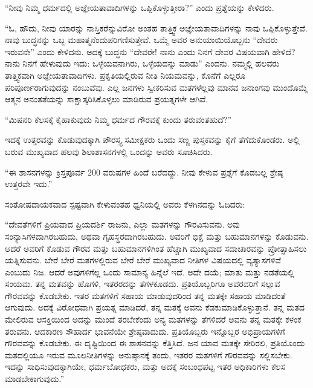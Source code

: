 \vskip 5pt

“ನೀವು ನಿಮ್ಮ ಧರ್ಮದಲ್ಲಿ ಅಜ್ಞೇಯತಾವಾದಿಗಳನ್ನು ಒಪ್ಪಿಕೊಳ್ಳುತ್ತೀರಾ?” ಎಂದು ಪ್ರಶ್ನೆಯನ್ನು ಕೇಳಿದರು.

\vskip 5pt

“ಓ, ಹೌದು, ನೀವು ಯಾರನ್ನು ನಾಸ್ತಿಕರೆನ್ನುವಿರೋ ಅಂತಹ ತಾತ್ತ್ವಿಕ ಅಜ್ಞೇಯತಾವಾದಿಗಳನ್ನು ನಾವು ಒಪ್ಪಿಕೊಳ್ಳುತ್ತೇವೆ. ನಾವು ಬುದ್ಧನನ್ನು ಒಬ್ಬ ಮಹಾತ್ಮನೆಂದು\break ಪರಿಗಣಿಸುತ್ತೇವೆ. ಒಮ್ಮೆ ಅವರ ಅನುಯಾಯಿಯೊಬ್ಬನು “ದೇವರು ಇರುವನೇ” ಎಂದು ಕೇಳಿದನು. ಅದಕ್ಕೆ ಬುದ್ಧನು “ದೇವರೇ! ನಾನು ಎಂದು ನಿನಗೆ ದೇವರ ವಿಷಯವಾಗಿ ಹೇಳಿದೆ? ನಾನು ನಿನಗೆ ಹೇಳುವುದು ಇದು: ಒಳ್ಳೆಯವನಾಗಿರು, ಒಳ್ಳೆಯದನ್ನು ಮಾಡು” ಎಂದನು. ನಮ್ಮಲ್ಲಿ ಹಲವರು ತಾತ್ತ್ವಿಕವಾಗಿ ಅಜ್ಞೇಯತಾವಾದಿಗಳು. ಪ್ರಕೃತಿಯಲ್ಲಿರುವ ನೀತಿ ನಿಯಮವನ್ನು, ಕೊನೆಗೆ ಎಲ್ಲರೂ ಪರಿಪೂರ್ಣರಾಗುವುದನ್ನು ನಂಬುವೆವು. ಎಲ್ಲ ಜನಗಳು ಸ್ವೀಕರಿಸುವ ಮತಗಳೆಲ್ಲವು ಮಾನವ ಜನಾಂಗವು ಮುಂದೊಮ್ಮೆ ಆತ್ಮನ ಅನಂತತೆಯನ್ನು ಸಾಕ್ಷಾತ್ಕರಿಸಿಕೊಳ್ಳಲು ಮಾಡಿರುವ ಪ್ರಯತ್ನಗಳೇ ಆಗಿವೆ.

\vskip 5pt

“ಮಿಷನರಿ ಕೆಲಸಕ್ಕೆ ಕೈಹಾಕುವುದು ನಿಮ್ಮ ಧರ್ಮದ ಗೌರವಕ್ಕೆ ಕುಂದು ತರುವಂತಹುದೆ?”

\vskip 5pt

ಇದಕ್ಕೆ ಉತ್ತರವನ್ನು ಕೊಡುವುದಕ್ಕಾಗಿ ಪೌರಸ್ತ್ಯ ಸಮೀಕ್ಷಕರು ಒಂದು ಸಣ್ಣ ಪುಸ್ತಕವನ್ನು ಕೈಗೆ ತೆಗೆದುಕೊಂಡರು. ಅಲ್ಲಿ ಬರುವ ಮುಖ್ಯವಾದ ಹಲವು ಶಿಲಾಶಾಸನಗಳಲ್ಲಿ ಒಂದನ್ನು ಅವರು ಸೂಚಿಸಿದರು.

\vskip 5pt

“ಈ ಶಾಸನಗಳನ್ನು ಕ್ರಿಸ್ತಪೂರ್ವ 200 ವರುಷಗಳ ಹಿಂದೆ ಬರೆದದ್ದು. ನೀವು ಕೇಳುವ ಪ್ರಶ್ನೆಗೆ ಕೊಡಬಲ್ಲ ಶ್ರೇಷ್ಠ ಉತ್ತರವೇ ಇದು.”

\vskip 5pt

ಸಂತೋಷದಾಯಕವಾದ ಸ್ಪಷ್ಟವಾಗಿ ಕೇಳುವಂತಹ ಧ್ವನಿಯಲ್ಲಿ ಅವರು ಕೆಳಗಿನದನ್ನು ಓದಿದರು:

\vskip 5pt

“ದೇವತೆಗಳಿಗೆ ಪ್ರಿಯವಾದ ಪ್ರಿಯದರ್ಶಿ ರಾಜನು, ಎಲ್ಲಾ ಮತಗಳನ್ನು ಗೌರವಿಸುವನು. ಅವು ಸಂನ್ಯಾಸಿಗಳದಾಗಿರಬಹುದು, ಅಥವಾ ಗೃಹಸ್ಥರದಾಗಿರಬಹುದು. ಅವರಿಗೆ ಭಿಕ್ಷೆ ಮತ್ತು ಬಹುಮಾನಗಳನ್ನು ಕೊಡುವನು. ಆದರೆ ಅವರಿಗೆ ಕೊಡುವ ಗೌರವ ಮತ್ತು ಬಹುಮಾನಗಳಿಗಿಂತ ಹೆಚ್ಚಾಗಿ ಮುಖ್ಯವಾದ ಸದಾಚಾರವನ್ನು ಪ್ರೋತ್ಸಾಹಿಸಲು ಯತ್ನಿಸುವನು. ಬೇರೆ ಬೇರೆ ಮತಗಳಲ್ಲಿರುವ ಬೇರೆ ಬೇರೆ ಮುಖ್ಯವಾದ ನೀತಿಗಳ ವಿಷಯದಲ್ಲಿ ವ್ಯತ್ಯಾಸಗಳಿವೆ ಎಂಬುದು ನಿಜ. ಆದರೆ ಅವುಗಳಿಗೆಲ್ಲ ಒಂದು ಸಾಮಾನ್ಯ ಹಿನ್ನೆಲೆ ಇದೆ. ಅದೇ ದಯೆ; ಮಾತು ಮತ್ತು ನಡತೆಯಲ್ಲಿ ಸಂಯಮ. ತನ್ನ ಮತವನ್ನು ಹೊಗಳಿ, ಇತರರದನ್ನು ತೆಗಳಕೂಡದು. ಪ್ರತಿಯೊಬ್ಬರಿಗೂ ಅವರವರಿಗೆ ಸಲ್ಲುವ ಗೌರವವನ್ನು ಕೊಡಬೇಕು. ಇತರ ಮತಗಳಿಗೆ ಸಹಾಯ ಮಾಡುವುದರಿಂದ ತನ್ನ ಮತಕ್ಕೇ ಸಹಾಯ ಮಾಡಿದಂತೆ ಆಗುವುದು. ಅದಕ್ಕೆ ವಿರೋಧವಾಗಿ ಪ್ರಯತ್ನ ಮಾಡಿದರೆ, ತನ್ನ ಮತಕ್ಕೆ ಅವನು ಕೆಡಕುಮಾಡಿಕೊಳ್ಳುತ್ತಾನೆ. ತನ್ನ ಮತದ ಮೇಲಿರುವ ಆಸಕ್ತಿಯಿಂದ ಅದನ್ನು ಮುಂದೆ ತರಬೇಕೆಂದು ಅನ್ಯ ಮತಗಳನ್ನು ತೆಗಳಿದರೆ ಅವನು ತನ್ನ ಮತಕ್ಕೇ ಕಳಂಕ ತರುವನು. ಆದಕಾರಣ ಸೌಹಾರ್ದ ಭಾವನೆಯೇ ಶ್ರೇಷ್ಠವಾದುದು. ಪ್ರತಿಯೊಬ್ಬರು ಇನ್ನೊಬ್ಬರ ಅಭಿಪ್ರಾಯಗಳಿಗೆ ಗೌರವವನ್ನು ಕೊಡಬೇಕು. ಈ ದೃಷ್ಟಿಯಿಂದ ಈ ಶಾಸನವನ್ನು ಕೆತ್ತಿಸಿದೆ. ಜನ ಯಾವ ಮತಕ್ಕೇ ಸೇರಿರಲಿ, ಪ್ರತಿಯೊಂದು ಮತದಲ್ಲಿಯೂ ಇರುವ ಮೂಲನೀತಿಗಳನ್ನು ಅನುಷ್ಠಾನಕ್ಕೆ ತಂದು, ಇತರರ ಮತಗಳಿಗೆ ಗೌರವವನ್ನು ಸಲ್ಲಿಸಬೇಕು. ಇದನ್ನು ಸಾಧಿಸುವುದಕ್ಕಾಗಿಯೇ, ಧರ್ಮಬೋಧಕರು, ಮತ್ತು ಅದಕ್ಕೆ ಸಂಬಂಧಪಟ್ಟ ಇತರ ಅಧಿಕಾರಿಗಳು ಕೆಲಸ ಮಾಡಬೇಕಾಗುವುದು.”

